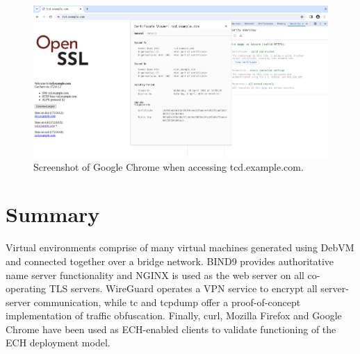 \begin{figure}[ht]
\centerline{\includegraphics[width=120mm]{images/chrome.png}}
\caption[Screenshot of Google Chrome when accessing tcd.example.com]{Screenshot of Google Chrome when accessing tcd.example.com.}
\label{chrome_screenshot_figure}
\end{figure}











\section{Summary}

Virtual environments comprise of many virtual machines generated using DebVM and connected together over a bridge network. BIND9 provides authoritative name server functionality and NGINX is used as the web server on all co-operating TLS servers. WireGuard operates a VPN service to encrypt all server-server communication, while tc and tcpdump offer a proof-of-concept implementation of traffic obfuscation. Finally, curl, Mozilla Firefox and Google Chrome have been used as ECH-enabled clients to validate functioning of the ECH deployment model.
